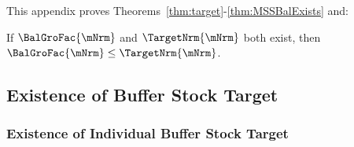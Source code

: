 \documentclass[\econtexRoot/BufferStockTheory]{subfiles}
\begin{document}
This appendix proves Theorems~\ref{thm:target}-\ref{thm:MSSBalExists} and:
\compilingassubfile{\setcounter{theorem}{1}}

  \begin{lemma}
  If $\BalGroFac{\mNrm}$ and $\TargetNrm{\mNrm}$ both exist, then $\BalGroFac{\mNrm} \leq \TargetNrm{\mNrm}$.
  \end{lemma}

\subsection{Existence of Buffer Stock Target}

\subsubsection{Existence of Individual Buffer Stock Target}\label{subsubsec:AppxIndividTarget} %
%
  
\end{document}
